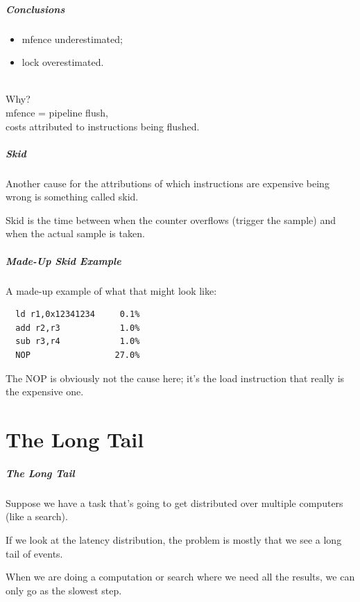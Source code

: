 \begin{frame}
  \frametitle{Conclusions}

  
    \begin{itemize}
    \item mfence underestimated;
      \item lock overestimated.
    \end{itemize}
    ~\\
    Why? \\[1em]
    mfence = pipeline flush,\\
    costs attributed to instructions being flushed.\\
  

\end{frame}

\begin{frame}
\frametitle{Skid}

Another cause for the attributions of which instructions are expensive being wrong is something called \alert{skid}.

Skid is the time between when the counter overflows (trigger the sample) and when the actual sample is taken.

\end{frame}

\begin{frame}[fragile]
\frametitle{Made-Up Skid Example}

A made-up example of what that might look like:
\begin{verbatim}
  ld r1,0x12341234     0.1%
  add r2,r3            1.0%
  sub r3,r4            1.0%
  NOP                 27.0%
\end{verbatim}
The NOP is obviously not the cause here; it's the load instruction that really is the expensive one.

\end{frame}


\part{The Long Tail}

\begin{frame}
\partpage
\end{frame}



\begin{frame}
\frametitle{The Long Tail}

Suppose we have a task that's going to get distributed over multiple computers (like a search). 

If we look at the latency distribution, the problem is mostly that we see a long tail of events. 

When we are doing a computation or search where we need all the results, we can only go as the slowest step.

\end{frame}



